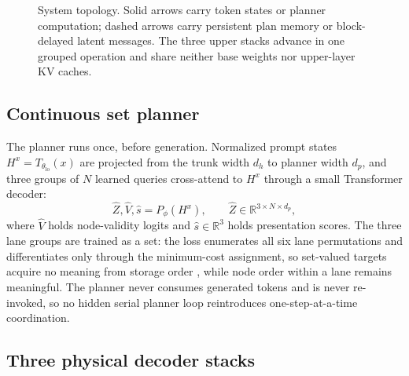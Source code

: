 \documentclass[10pt]{article}
\newcommand{\R}{\mathbb{R}}
\begin{document}
\begin{figure}[t]
\caption{System topology. Solid arrows carry token states or planner
computation; dashed arrows carry persistent plan memory or block-delayed
latent messages. The three upper stacks advance in one grouped operation and
share neither base weights nor upper-layer KV caches.}
\label{fig:architecture}
\end{figure}

\subsection{Continuous set planner}

The planner runs once, before generation. Normalized prompt states
\(
H^x=T_{\theta_{\mathrm{lo}}}(x)
\)
are projected from the trunk width \(d_h\) to planner width \(d_p\), and
three groups of \(N\) learned queries cross-attend to \(H^x\) through a small
Transformer decoder:
\begin{equation}
\hat Z,\hat V,\hat s=P_\phi(H^x),\qquad
\hat Z\in\R^{3\times N\times d_p},
\end{equation}
where \(\hat V\) holds node-validity logits and \(\hat s\in\R^3\) holds
presentation scores. The three lane groups are trained as a set: the loss
enumerates all six lane permutations and differentiates only through the
minimum-cost assignment, so set-valued targets acquire no meaning from
storage order \citep{lee2019settransformer}, while node order within a lane
remains meaningful. The planner never consumes generated tokens and is never
re-invoked, so no hidden serial planner loop reintroduces
one-step-at-a-time coordination.

\subsection{Three physical decoder stacks}
\end{document}
